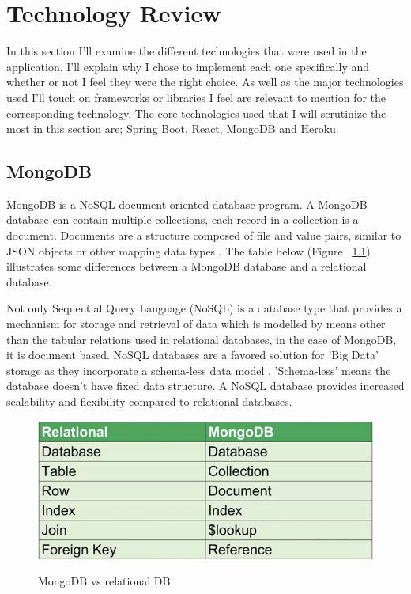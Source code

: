 \chapter{Technology Review}
In this section I'll examine the different technologies that were used in the application. I'll explain why I chose to implement each one specifically and whether or not I feel they were the right choice. As well as the major technologies used I'll touch on frameworks or libraries I feel are relevant to mention for the corresponding technology. The core technologies used that I will scrutinize the most in this section are; Spring Boot, React, MongoDB and Heroku.

\section{MongoDB}
MongoDB is a NoSQL document oriented database program. A MongoDB database can contain multiple collections, each record in a collection is a document. Documents are a structure composed of file and value pairs, similar to JSON objects or other mapping data types \cite{Mongo:doc}. The table below (Figure ~\ref{mongo2_label}) illustrates some differences between a MongoDB database and a relational database.

Not only Sequential Query Language (NoSQL) is a database type that provides a mechanism for storage and retrieval of data which is modelled by means other than the tabular relations used in relational databases, in the case of MongoDB, it is document based. NoSQL databases are a favored solution for 'Big Data' storage as they incorporate a schema-less data model \cite{wiki:nosql}. 'Schema-less' means the database doesn't have fixed data structure. A NoSQL database provides increased scalability and ﬂexibility compared to relational databases.

\begin{figure}[h]
    \centering
    \includegraphics[scale=0.4]{Images/mongo2.png} 
    \label{mongo2_label}
    \caption{MongoDB vs relational DB}
\end{figure}

